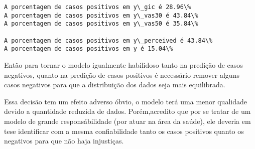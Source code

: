 \documentclass[11pt]{article}
\begin{document}
    \begin{Verbatim}[commandchars=\\\{\}]
A porcentagem de casos positivos em y\_gic é 28.96\%
A porcentagem de casos positivos em y\_vas30 é 43.84\%
A porcentagem de casos positivos em y\_vas50 é 35.84\%

A porcentagem de casos positivos em y\_perceived é 43.84\%
A porcentagem de casos positivos em y é 15.04\%
    \end{Verbatim}

    Então para tornar o modelo igualmente habilidoso tanto na predição de
casos negativos, quanto na predição de casos positivos é necessário
remover alguns casos negativos para que a distribuição dos dados seja
mais equilibrada.

Essa decisão tem um efeito adverso óbvio, o modelo terá uma menor
qualidade devido a quantidade reduzida de dados. Porém,acredito que por
se tratar de um modelo de grande responsábilidade (por atuar na área da
saúde), ele deveria em tese identificar com a mesma confiabilidade tanto
os casos positivos quanto os negativos para que não haja injustiças.
\end{document}
